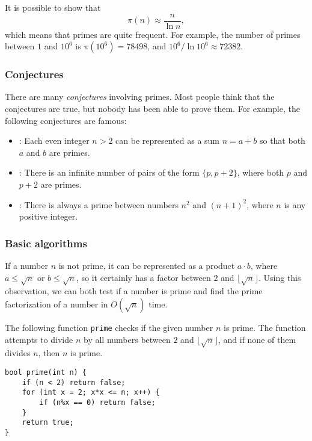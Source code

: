 It is possible to show that
\[\pi(n) \approx \frac{n}{\ln n},\]
which means that primes are quite frequent.
For example, the number of primes between
$1$ and $10^6$ is $\pi(10^6)=78498$,
and $10^6 / \ln 10^6 \approx 72382$.

\subsubsection{Conjectures}

There are many \emph{conjectures} involving primes.
Most people think that the conjectures are true,
but nobody has been able to prove them.
For example, the following conjectures are famous:

\begin{itemize}
\item {}:
Each even integer $n>2$ can be represented as a
sum $n=a+b$ so that both $a$ and $b$ are primes.
\item {}:
There is an infinite number of pairs
of the form $\{p,p+2\}$,
where both $p$ and $p+2$ are primes.
\item {}:
There is always a prime between numbers
$n^2$ and $(n+1)^2$, where $n$ is any positive integer.
\end{itemize}

\subsubsection{Basic algorithms}

If a number $n$ is not prime,
it can be represented as a product $a \cdot b$,
where $a \le \sqrt n$ or $b \le \sqrt n$,
so it certainly has a factor between $2$ and $\lfloor \sqrt n \rfloor$.
Using this observation, we can both test
if a number is prime and find the prime factorization
of a number in $O(\sqrt n)$ time.

The following function \texttt{prime} checks
if the given number $n$ is prime.
The function attempts to divide $n$ by
all numbers between $2$ and $\lfloor \sqrt n \rfloor$,
and if none of them divides $n$, then $n$ is prime.

\begin{lstlisting}
bool prime(int n) {
    if (n < 2) return false;
    for (int x = 2; x*x <= n; x++) {
        if (n%x == 0) return false;
    }
    return true;
}
\end{lstlisting}

